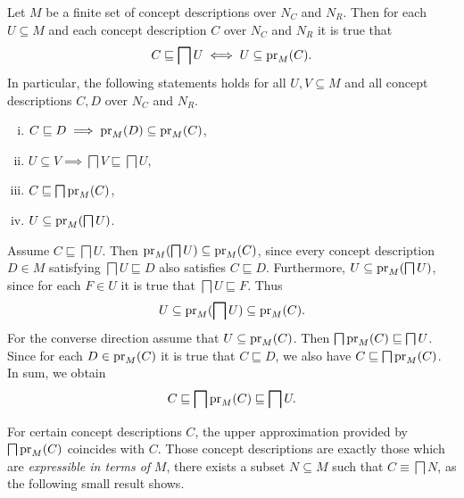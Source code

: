 \begin{Lemma}
  \label{lem:pr-bigsqcap-forms-Galois-connection}
  Let $M$ be a finite set of concept descriptions over $N_C$ and $N_R$.  Then for each $U
  \subseteq M$ and each concept description $C$ over $N_C$ and $N_R$ it is true that
  \begin{equation*}
    C \sqsubseteq \bigsqcap U \iff U \subseteq \operatorname{pr}_M(C).
  \end{equation*}
  In particular, the following statements holds for all $U, V \subseteq M$ and all concept
  descriptions $C, D$ over $N_C$ and $N_R$.
  \begin{enumerate}[i. ]
  \item $C \sqsubseteq D \implies \operatorname{pr}_M(D) \subseteq \operatorname{pr}_M(C)$,
  \item $U \subseteq V \implies \bigsqcap V \sqsubseteq \bigsqcap U$,
  \item $C \sqsubseteq \bigsqcap \operatorname{pr}_M(C)$,
  \item $U \subseteq \operatorname{pr}_M(\bigsqcap U)$.
  \end{enumerate}
\end{Lemma}
\begin{Proof}
  Assume $C \sqsubseteq \bigsqcap U$.  Then $\operatorname{pr}_M(\bigsqcap U) \subseteq \operatorname{pr}_M(C)$, since
  every concept description $D \in M$ satisfying $\bigsqcap U \sqsubseteq D$ also
  satisfies $C \sqsubseteq D$.  Furthermore, $U \subseteq \operatorname{pr}_M(\bigsqcap U)$, since for
  each $F \in U$ it is true that $\bigsqcap U \sqsubseteq F$.  Thus
  \begin{equation*}
    U \subseteq \operatorname{pr}_M(\bigsqcap U) \subseteq \operatorname{pr}_M(C).
  \end{equation*}
  For the converse direction assume that $U \subseteq \operatorname{pr}_M(C)$.  Then $\bigsqcap \operatorname{pr}_M(C)
  \sqsubseteq \bigsqcap U$.  Since for each $D \in \operatorname{pr}_M(C)$ it is true that $C
  \sqsubseteq D$, we also have $C \sqsubseteq \bigsqcap \operatorname{pr}_M(C)$.  In sum, we obtain
  \begin{equation*}
    C \sqsubseteq \bigsqcap \operatorname{pr}_M(C) \sqsubseteq \bigsqcap U.
  \end{equation*}
\end{Proof}

For certain concept descriptions $C$, the upper approximation provided by $\bigsqcap
\operatorname{pr}_M(C)$ coincides with $C$.  Those concept descriptions are exactly those which are
\emph{expressible in terms of} $M$, \ie there exists a subset $N \subseteq M$ such that $C
\equiv \bigsqcap N$, as the following small result shows.

